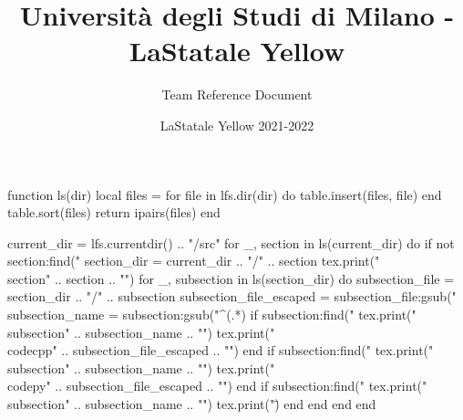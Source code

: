 \documentclass[8pt,a4paper,landscape,oneside]{amsart}
\author{LaStatale Yellow 2021-2022}
\title{Università degli Studi di Milano - LaStatale Yellow}
\subtitle{Team Reference Document}
\date{\ddmmyyyydate{\today{}}}
\newcommand{\codecpp}[1]{\inputminted[fontsize=\normalsize,baselinestretch=1,xleftmargin=2.5em,linenos]{cpp}{#1}}
\newcommand{\codepy}[1]{\inputminted[fontsize=\normalsize,baselinestretch=1,xleftmargin=2.5em,linenos]{python}{#1}}
\begin{document}
\begin{multicols*}{3}
\maketitle
\thispagestyle{fancy}
\vspace{-3em}
\tableofcontents
\vspace{-4em}
\begin{luacode*}

function ls(dir)
    local files = {}
    for file in lfs.dir(dir) do
        table.insert(files, file)
    end
    table.sort(files)
    return ipairs(files)
end

current_dir = lfs.currentdir() .. "/src"
for _, section in ls(current_dir) do
    if not section:find("%
        section_dir = current_dir .. "/" .. section
        tex.print("\\section{" .. section .. "}")
        for _, subsection in ls(section_dir) do
            subsection_file = section_dir .. "/" .. subsection
            subsection_file_escaped = subsection_file:gsub("%
            subsection_name = subsection:gsub("^(.*)%
            if subsection:find("%
                tex.print("\\subsection{" .. subsection_name .. "}")
                tex.print("\\codecpp{" .. subsection_file_escaped .. "}")
            end
            if subsection:find("%
                tex.print("\\subsection{" .. subsection_name .. "}")
                tex.print("\\codepy{" .. subsection_file_escaped .. "}")
            end
            if subsection:find("%
                tex.print("\\subsection{" .. subsection_name .. "}")
                tex.print("\")
            end
        end
    end
end

\end{luacode*}
\end{multicols*}
\end{document}
